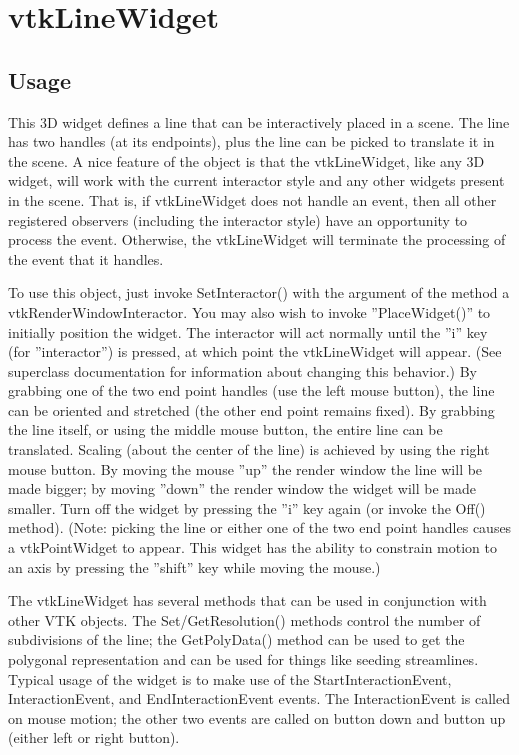 \section{vtkLineWidget}

\subsection{Usage}

 This 3D widget defines a line that can be interactively placed in a
 scene. The line has two handles (at its endpoints), plus the line can be
 picked to translate it in the scene.  A nice feature of the object is that
 the vtkLineWidget, like any 3D widget, will work with the current
 interactor style and any other widgets present in the scene. That is, if
 vtkLineWidget does not handle an event, then all other registered
 observers (including the interactor style) have an opportunity to process
 the event. Otherwise, the vtkLineWidget will terminate the processing of
 the event that it handles.

 To use this object, just invoke SetInteractor() with the argument of the
 method a vtkRenderWindowInteractor.  You may also wish to invoke
 ''PlaceWidget()'' to initially position the widget. The interactor will act
 normally until the ''i'' key (for ''interactor'') is pressed, at which point
 the vtkLineWidget will appear. (See superclass documentation for
 information about changing this behavior.) By grabbing one of the two end
 point handles (use the left mouse button), the line can be oriented and
 stretched (the other end point remains fixed). By grabbing the line
 itself, or using the middle mouse button, the entire line can be
 translated.  Scaling (about the center of the line) is achieved by using
 the right mouse button. By moving the mouse ''up'' the render window the
 line will be made bigger; by moving ''down'' the render window the widget
 will be made smaller. Turn off the widget by pressing the ''i'' key again
 (or invoke the Off() method). (Note: picking the line or either one of the
 two end point handles causes a vtkPointWidget to appear.  This widget has
 the ability to constrain motion to an axis by pressing the ''shift'' key
 while moving the mouse.)

 The vtkLineWidget has several methods that can be used in conjunction with
 other VTK objects. The Set/GetResolution() methods control the number of
 subdivisions of the line; the GetPolyData() method can be used to get the
 polygonal representation and can be used for things like seeding
 streamlines. Typical usage of the widget is to make use of the
 StartInteractionEvent, InteractionEvent, and EndInteractionEvent
 events. The InteractionEvent is called on mouse motion; the other two
 events are called on button down and button up (either left or right
 button).

